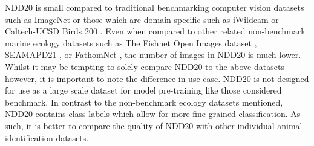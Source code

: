 NDD20 is small compared to traditional benchmarking computer vision datasets such as ImageNet \cite{deng_imagenet:_2009} or those which are domain specific such as iWildcam \cite{beery_iwildcam_2019} or Caltech-UCSD Birds 200 \cite{welinder_caltech-ucsd_2010}. Even when compared to other related non-benchmark marine ecology datasets such as The Fishnet Open Images dataset \cite{kay_fishnet_2021}, SEAMAPD21 \cite{boulais_seamapd21_2021}, or FathomNet \cite{katija_fathomnet_2022}, the number of images in NDD20 is much lower. Whilst it may be tempting to solely compare NDD20 to the above datasets however, it is important to note the difference in use-case. NDD20 is not designed for use as a large scale dataset for model pre-training like those considered benchmark. In contrast to the non-benchmark ecology datasets mentioned, NDD20 contains class labels which allow for more fine-grained classification. As such, it is better to compare the quality of NDD20 with other individual animal identification datasets.

